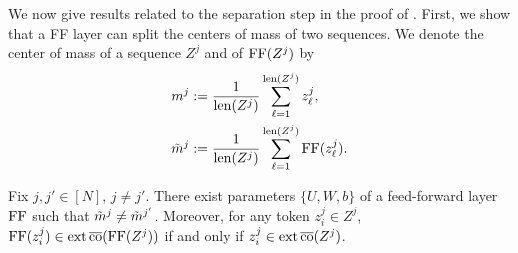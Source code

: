\documentclass[11pt,a4paper]{amsart}
\begin{document}
We now give results related to the separation step in the proof of . First, we show that a FF layer can split the centers of mass of two sequences. We denote the center of mass of a sequence $Z^j$ and of $\operatorname{\mathrm{FF}}(Z^j)$ by
\begin{subequations}
    \begin{align}
    m^{j} &:= \frac{1}{\operatorname{len} (Z^j)}\sum_{\ell=1}^{\operatorname{len} (Z^j)} z_\ell^j,\\
    \Tilde{m}^j &:= \frac{1}{\operatorname{len} (Z^j)}\sum_{\ell=1}^{\operatorname{len} (Z^j)} \operatorname{\mathrm{FF}}(z_\ell^j).
\end{align}
\end{subequations}
\begin{lemma}\label{lem:splitCentersOfMass}
Fix $j, j'\in [N]$, $j\neq j'$. There exist parameters $\{ U, W, b\}$ of a feed-forward layer $\operatorname{\mathrm{FF}}$ such that $\Tilde{m}^j \neq \Tilde{m}^{j'}$. Moreover, for any token $z_i^j\in Z^j$, $\operatorname{\mathrm{FF}}(z_i^j)\in \operatorname{ext} \operatorname{\overline{co}} (\operatorname{\mathrm{FF}}(Z^j))$ if and only if $z_i^j\in \operatorname{ext} \operatorname{\overline{co}} (Z^j)$. 
\end{lemma}
\end{document}
